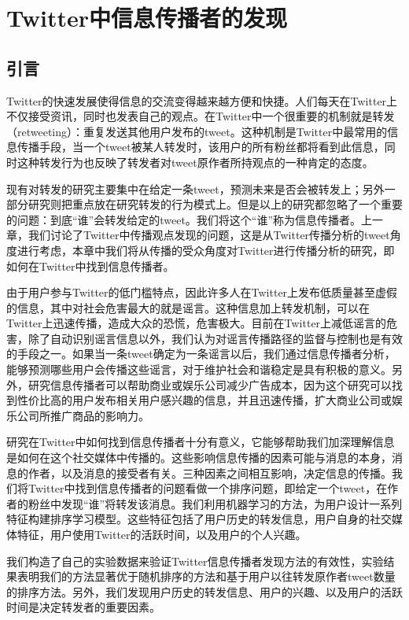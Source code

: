 \chapter{Twitter中信息传播者的发现}
\label{Retweeter}

\section{引言}
Twitter的快速发展使得信息的交流变得越来越方便和快捷。人们每天在Twitter上不仅接受资讯，同时也发表自己的观点。在Twitter中一个很重要的机制就是转发（retweeting）：重复发送其他用户发布的tweet。这种机制是Twitter中最常用的信息传播手段，当一个tweet被某人转发时，该用户的所有粉丝都将看到此信息，同时这种转发行为也反映了转发者对tweet原作者所持观点的一种肯定的态度。

现有对转发的研究主要集中在给定一条tweet，预测未来是否会被转发上；另外一部分研究则把重点放在研究转发的行为模式上。但是以上的研究都忽略了一个重要的问题：到底“谁”会转发给定的tweet。我们将这个“谁”称为信息传播者。上一章，我们讨论了Twitter中传播观点发现的问题，这是从Twitter传播分析的tweet角度进行考虑，本章中我们将从传播的受众角度对Twitter进行传播分析的研究，即如何在Twitter中找到信息传播者。

由于用户参与Twitter的低门槛特点，因此许多人在Twitter上发布低质量甚至虚假的信息，其中对社会危害最大的就是谣言。这种信息加上转发机制，可以在Twitter上迅速传播，造成大众的恐慌，危害极大。目前在Twitter上减低谣言的危害，除了自动识别谣言信息以外，我们认为对谣言传播路径的监督与控制也是有效的手段之一。如果当一条tweet确定为一条谣言以后，我们通过信息传播者分析，能够预测哪些用户会传播这些谣言，对于维护社会和谐稳定是具有积极的意义。另外，研究信息传播者可以帮助商业或娱乐公司减少广告成本，因为这个研究可以找到性价比高的用户发布相关用户感兴趣的信息，并且迅速传播，扩大商业公司或娱乐公司所推广商品的影响力。

研究在Twitter中如何找到信息传播者十分有意义，它能够帮助我们加深理解信息是如何在这个社交媒体中传播的。这些影响信息传播的因素可能与消息的本身，消息的作者，以及消息的接受者有关。三种因素之间相互影响，决定信息的传播。我们将Twitter中找到信息传播者的问题看做一个排序问题，即给定一个tweet，在作者的粉丝中发现“谁”将转发该消息。我们利用机器学习的方法，为用户设计一系列特征构建排序学习模型。这些特征包括了用户历史的转发信息，用户自身的社交媒体特征，用户使用Twitter的活跃时间，以及用户的个人兴趣。

我们构造了自己的实验数据来验证Twitter信息传播者发现方法的有效性，实验结果表明我们的方法显著优于随机排序的方法和基于用户以往转发原作者tweet数量的排序方法。另外，我们发现用户历史的转发信息、用户的兴趣、以及用户的活跃时间是决定转发者的重要因素。


